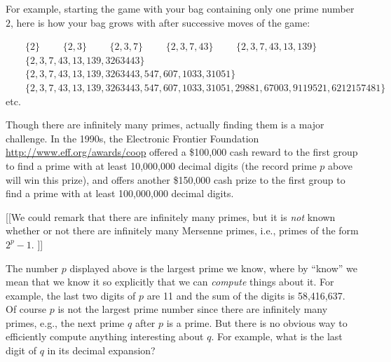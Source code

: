 \documentclass[11pt]{article}
\newcommand{\ill}[3]{ 
   \begin{figure}[H]
   \begin{center}
   \texttt{[image: illustrations/\#1]}
   \caption{#3}
   \end{center}
    \end{figure}
}
\theoremstyle{plain}
\theoremstyle{definition}
\numberwithin{equation}{section}
\numberwithin{figure}{section}
\numberwithin{table}{section}
\begin{document}
For example, starting the game with your bag containing
only one prime number $2$, here is how your bag grows with after
successive moves of the game:

$\mbox{}\qquad\{2\}$
\newline
$\mbox{}\qquad\{2,3\}$
\newline
$\mbox{}\qquad\{2,3, 7\}$
\newline
$\mbox{}\qquad\{2,3, 7, 43\}$
\newline
$\mbox{}\qquad\{2,3, 7, 43, 13, 139\}$
\newline
$\mbox{}\qquad\{2,3, 7, 43, 13, 139, 3263443\}$
\newline
$\mbox{}\qquad\{2,3, 7, 43, 13, 139, 3263443,  547, 607, 1033, 31051\}$
\newline
$\mbox{}\qquad\{2,3, 7, 43, 13, 139, 3263443,  547, 607, 1033, 31051, 29881, 67003,
9119521, 6212157481\}$
\newline
\mbox{}\qquad{}etc.


Though there are infinitely many primes, actually finding them is a
major challenge.  In the 1990s, the Electronic Frontier Foundation
\url{http://www.eff.org/awards/coop} offered a \$100,000 cash reward
to the first group to find a prime with at least 10,000,000 decimal
digits (the record prime $p$ above will win this prize), and offers
another \$150,000 cash prize to the first group to find a prime with
at least 100,000,000 decimal digits.

[[We could remark that there are infinitely many primes, but it
is {\em not} known whether or not there are infinitely
many Mersenne primes, i.e., primes of the form $2^p - 1$. ]]

The number $p$ displayed above is the largest prime we know, where by
``know'' we mean that we know it so explicitly that we can {\em
  compute} things about it.  For example, the last two digits of $p$
are 11 and the sum of the digits is 58,416,637.  Of course $p$ is not
the largest prime number since there are infinitely many primes, e.g.,
the next prime $q$ after $p$ is a prime.  But there is no obvious way
to efficiently compute anything interesting about $q$.  For example,
what is the last digit of $q$ in its decimal expansion?

\bigskip

\end{document}
